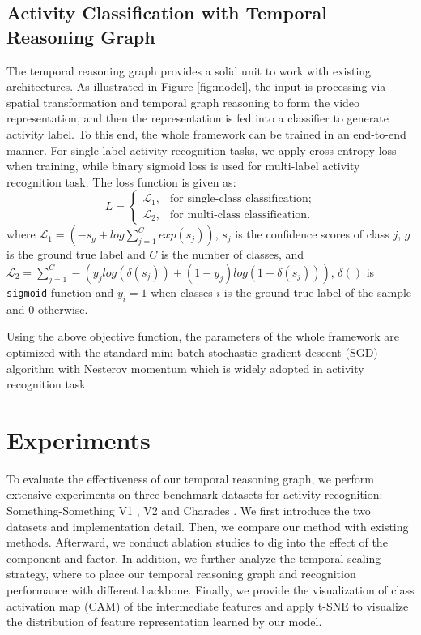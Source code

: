 \documentclass[conference,compsoc]{IEEEtran}
\begin{document}
\subsection{Activity Classification with Temporal Reasoning Graph}
    The temporal reasoning graph provides a solid unit to work with existing architectures. As illustrated in Figure \ref{fig:model}, the input is processing via spatial transformation and temporal graph reasoning to form the video representation, and then the representation is fed into a classifier to generate activity label. To this end, the whole framework can be trained in an end-to-end manner. For single-label activity recognition tasks, we apply cross-entropy loss when training, while binary sigmoid loss is used for multi-label activity recognition task. The loss function is given as:
\begin{equation}
        L = \begin{cases}
        \mathcal{L}_1, & \text{for single-class classification;} \\
        \mathcal{L}_2, & \text{for multi-class classification.}
        \end{cases}
    \end{equation}
    where $\mathcal{L}_1 = \left(-s_g + log \sum_{j=1}^{C}exp(s_j) \right)$, $s_j$ is the confidence scores of class $j$, $g$ is the ground true label and $C$ is the number of classes, and $\mathcal{L}_2 = \sum_{j=1}^{C} -\left( y_j log(\delta(s_j)) + (1-y_j)log(1-\delta(s_j)) \right)$, $\delta()$ is \texttt{sigmoid} function and $y_i=1$ when classes $i$ is the ground true label of the sample and 0 otherwise.
    
    Using the above objective function, the parameters of the whole framework are optimized with the standard mini-batch stochastic gradient descent (SGD) algorithm with Nesterov momentum which is widely adopted in activity recognition task \cite{wang2016temporal, zhou2018temporal, wang2018videos}.
    

\section{Experiments}
\label{sec:experiments}

    To evaluate the effectiveness of our temporal reasoning graph, we perform extensive experiments on three benchmark datasets for activity recognition: Something-Something V1 \cite{goyal2017something}, V2 \cite{mahdisoltani2018fine} and Charades \cite{sigurdsson2016hollywood}. We first introduce the two datasets and implementation detail. Then, we compare our method with existing methods. Afterward, we conduct ablation studies to dig into the effect of the component and factor. In addition, we further analyze the temporal scaling strategy, where to place our temporal reasoning graph and recognition performance with different backbone. Finally, we provide the visualization of class activation map (CAM) \cite{zhou2016learning} of the intermediate features and apply t-SNE \cite{dermaaten2008visualizing} to visualize the distribution of feature representation learned by our model.
\end{document}
